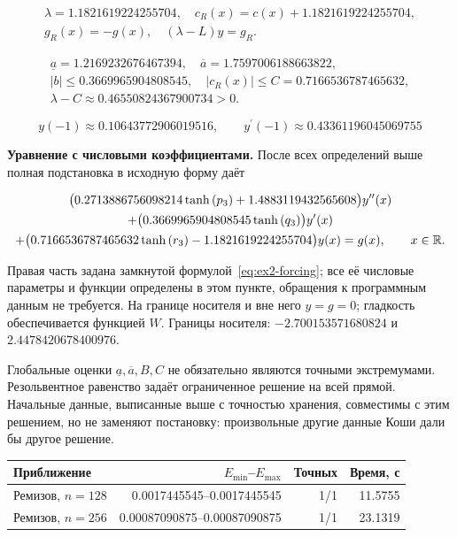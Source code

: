 \begin{equation}
\begin{aligned}\lambda=1.1821619224255704,\quad c_R(x)=c(x)+1.1821619224255704,\\g_R(x)=-g(x),\quad (\lambda-L)y=g_R.\end{aligned}
\end{equation}


\begin{equation}
\begin{aligned}\underline a=1.2169232676467394,\quad \overline a=1.7597006188663822,\\|b|\le0.3669965904808545,\quad |c_R(x)|\le C=0.7166536787465632,\\\lambda-C\approx0.46550824367900734>0.\end{aligned}
\end{equation}


\begin{equation}
y(-1)\approx0.10643772906019516,\qquad y^\prime(-1)\approx0.43361196045069755
\end{equation}


\noindent\textbf{Уравнение с числовыми коэффициентами.} После всех определений выше полная подстановка в исходную форму даёт

\begin{multline}\label{eq:ex2-ode}\bigl(0.2713886756098214 \tanh{\left(p_{3} \right)} + 1.4883119432565608\bigr)y^{\prime\prime}(x)\\+\bigl(0.3669965904808545 \tanh{\left(q_{3} \right)}\bigr)y^\prime(x)\\+\bigl(0.7166536787465632 \tanh{\left(r_{3} \right)} - 1.1821619224255704\bigr)y(x)=g(x),\qquad x\in\mathbb R.\end{multline}

Правая часть задана замкнутой формулой~\eqref{eq:ex2-forcing}; все её числовые параметры и функции определены в этом пункте, обращения к программным данным не требуется. На границе носителя и вне него $y=g=0$; гладкость обеспечивается функцией $W$. Границы носителя: $-2.700153571680824$ и $2.4478420678400976$.

Глобальные оценки $\underline a,\overline a,B,C$ не обязательно являются точными экстремумами. Резольвентное равенство задаёт ограниченное решение на всей прямой. Начальные данные, выписанные выше с точностью хранения, совместимы с этим решением, но не заменяют постановку: произвольные другие данные Коши дали бы другое решение.

\begin{center}\label{tab:ex2}\begin{tabular}{lrrr}\toprule Приближение&$E_{\min}$--$E_{\max}$&Точных&Время, с\\\midrule

Ремизов, $n=128$&0.0017445545--0.0017445545&1/1&11.5755\\

Ремизов, $n=256$&0.00087090875--0.00087090875&1/1&23.1319\\

\bottomrule\end{tabular}\end{center}

